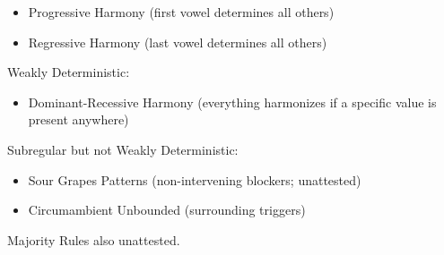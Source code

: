\begin{itemize}
  \item Progressive Harmony (first vowel determines all others)
  \item Regressive Harmony (last vowel determines all others)
\end{itemize}

Weakly Deterministic:

\begin{itemize}
  \item Dominant-Recessive Harmony (everything harmonizes if a specific value is present anywhere)
\end{itemize}

Subregular but not Weakly Deterministic:

\begin{itemize}
  \item Sour Grapes Patterns (non-intervening blockers; unattested)
  \item Circumambient Unbounded (surrounding triggers)
\end{itemize}

Majority Rules also unattested.
